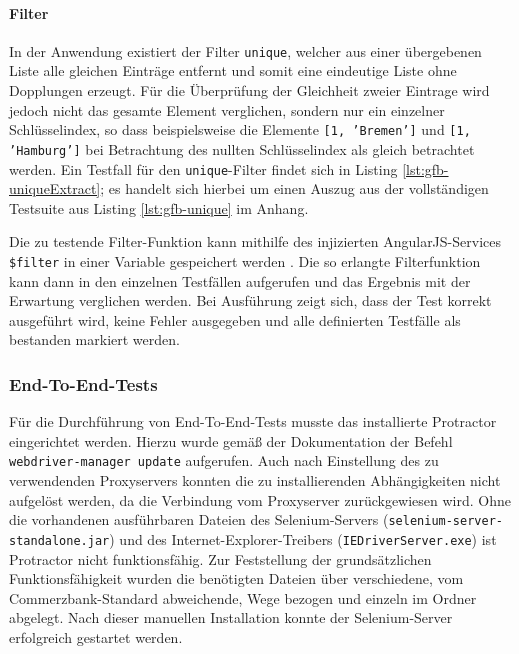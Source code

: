 \paragraph{Filter}
In der Anwendung existiert der Filter \texttt{unique}, welcher aus einer übergebenen Liste alle gleichen Einträge entfernt und somit eine eindeutige Liste ohne Dopplungen erzeugt. Für die Überprüfung der Gleichheit zweier Eintrage wird jedoch nicht das gesamte Element verglichen, sondern nur ein einzelner Schlüsselindex, so dass beispielsweise die Elemente \texttt{[1, 'Bremen']} und \texttt{[1, 'Hamburg']} bei Betrachtung des nullten Schlüsselindex als gleich betrachtet werden. Ein Testfall für den \texttt{unique}-Filter findet sich in Listing \ref{lst:gfb-uniqueExtract}; es handelt sich hierbei um einen Auszug aus der vollständigen Testsuite aus Listing \ref{lst:gfb-unique} im Anhang.

\begin{figure}[H]
	
\end{figure}

Die zu testende Filter-Funktion kann mithilfe des injizierten AngularJS-Services \texttt{\$filter} in einer Variable gespeichert werden  \cite{angular-filter}. Die so erlangte Filterfunktion kann dann in den einzelnen Testfällen aufgerufen und das Ergebnis mit der Erwartung verglichen werden. Bei Ausführung zeigt sich, dass der Test korrekt ausgeführt wird, keine Fehler ausgegeben und alle definierten Testfälle als bestanden markiert werden.

\subsubsection{End-To-End-Tests}
Für die Durchführung von End-To-End-Tests musste das installierte Protractor eingerichtet werden. Hierzu wurde gemäß der Dokumentation  \cite{protractor-index} der Befehl \texttt{webdriver-manager update} aufgerufen. Auch nach Einstellung des zu verwendenden Proxyservers konnten die zu installierenden Abhängigkeiten nicht aufgelöst werden, da die Verbindung vom Proxyserver zurückgewiesen wird. Ohne die vorhandenen ausführbaren Dateien des Selenium-Servers (\texttt{selenium-server-standalone.jar}) und des Internet-Explorer-Treibers (\texttt{IEDriverServer.exe}) ist Protractor nicht funktionsfähig. Zur Feststellung der grundsätzlichen Funktionsfähigkeit wurden die benötigten Dateien über verschiedene, vom Commerzbank-Standard abweichende, Wege bezogen und einzeln im Ordner abgelegt. Nach dieser manuellen Installation konnte der Selenium-Server erfolgreich gestartet werden. 

